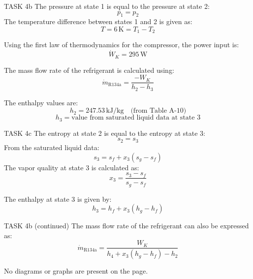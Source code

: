 TASK 4b  
The pressure at state 1 is equal to the pressure at state 2:  
\[
p_1 = p_2
\]  
The temperature difference between states 1 and 2 is given as:  
\[
T = 6 \, \text{K} = T_1 - T_2
\]  

Using the first law of thermodynamics for the compressor, the power input is:  
\[
\dot{W}_K = 295 \, \text{W}
\]  

The mass flow rate of the refrigerant is calculated using:  
\[
\dot{m}_{\text{R134a}} = \frac{-W_K}{h_2 - h_3}
\]  

The enthalpy values are:  
\[
h_2 = 247.53 \, \text{kJ/kg} \quad \text{(from Table A-10)}
\]  
\[
h_3 = \text{value from saturated liquid data at state 3}
\]  

TASK 4c  
The entropy at state 2 is equal to the entropy at state 3:  
\[
s_2 = s_3
\]  
From the saturated liquid data:  
\[
s_3 = s_f + x_3 (s_g - s_f)
\]  
The vapor quality at state 3 is calculated as:  
\[
x_3 = \frac{s_3 - s_f}{s_g - s_f}
\]  

The enthalpy at state 3 is given by:  
\[
h_3 = h_f + x_3 (h_g - h_f)
\]  

TASK 4b (continued)  
The mass flow rate of the refrigerant can also be expressed as:  
\[
\dot{m}_{\text{R134a}} = \frac{W_K}{h_4 + x_3 (h_g - h_f) - h_2}
\]  

No diagrams or graphs are present on the page.